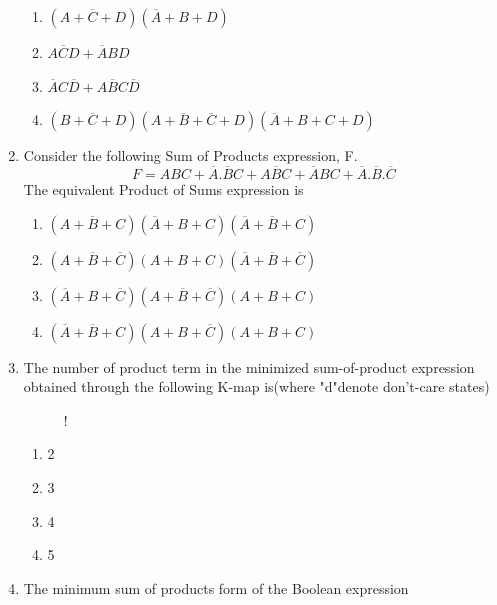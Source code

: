 \documentclass[journal,12pt,twocolumn]{IEEEtran}
\begin{document}
\begin{enumerate}
    \begin{enumerate}
      \item $(A+\overline{C}+D)(\overline{A}+B+D)$
      \item $A\overline{C}D+\overline{A}BD$
      \item $\overline{A}C\overline{D}+A\overline{B}C\overline{D}$
      \item $(B+\overline{C}+D)(A+\overline{B}+\overline{C}+D)(\overline{A}+B+C+D)$
    \end{enumerate}
    \item Consider the following Sum of Products expression, F.
    $$F=ABC+\overline{A}.\overline{B}C+A\overline{B}C+\overline{A}BC+\overline{A}.\overline{B}.\overline{C}$$
    The equivalent Product of Sums expression is
    \begin{enumerate}
      \item $(A+\overline{B}+C)(\overline{A}+B+C)(\overline{A}+\overline{B}+C)$
      \item $(A+\overline{B}+\overline{C})(A+B+C)(\overline{A}+\overline{B}+\overline{C})$
      \item $(\overline{A}+B+\overline{C})(A+\overline{B}+\overline{C})(A+B+C)$
      \item $(\overline{A}+\overline{B}+C)(A+B+\overline{C})(A+B+C)$
    \end{enumerate}
    \item The number of product term in the minimized sum-of-product expression obtained through the following K-map is(where "d"denote don't-care states)
\begin{figure}[!h]
\centering
\resizebox {\columnwidth} {!} {

}
\caption{}
\end{figure}
                        \begin{enumerate}
      \item 2 
      \item 3
      \item 4
      \item 5
    \end{enumerate}
    \item The minimum sum of products form of the Boolean expression

\end{enumerate}
\end{document}
